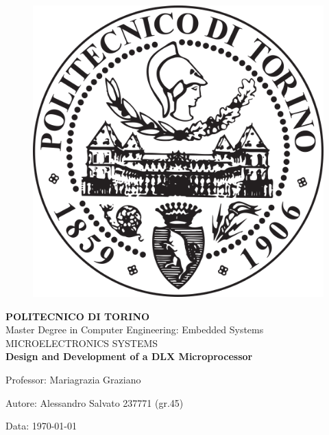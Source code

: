 \thispagestyle{empty}

\begin{figure}[H]
\centering
\includegraphics[scale=.3]{Immagini/262}
\label{262}
\end{figure}
\begin{center}
\LARGE { \textbf {POLITECNICO DI TORINO} }\\ [2\baselineskip]
\normalsize{Master Degree in Computer Engineering: Embedded Systems}\\
MICROELECTRONICS SYSTEMS \\ [2\baselineskip]
\Huge{ \textbf{Design and Development of a DLX Microprocessor}}\\ [2\baselineskip]

\end{center}

\begin{flushleft}
Professor: Mariagrazia Graziano
\end{flushleft}
\begin{flushleft}
Autore:  Alessandro Salvato 237771 (gr.45)
\end{flushleft}
\begin{flushleft}
Data: \today
\end{flushleft}

\clearpage
